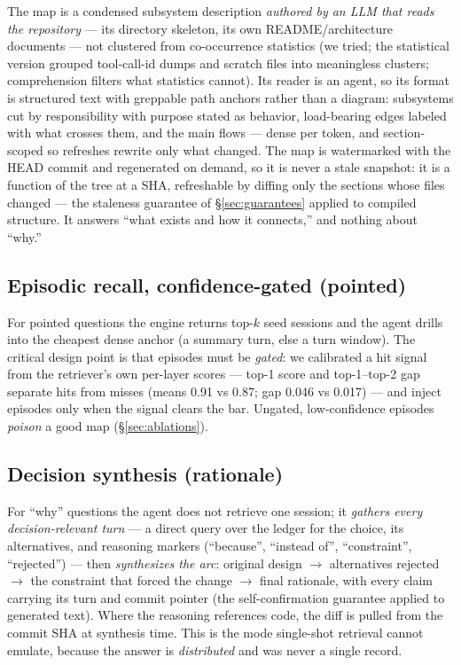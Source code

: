\documentclass[twocolumn,10pt]{article}
\begin{document}
The map is a condensed subsystem description \emph{authored by an LLM that reads the repository} --- its directory skeleton, its own README/architecture documents --- not clustered from co-occurrence statistics (we tried; the statistical version grouped tool-call-id dumps and scratch files into meaningless clusters; comprehension filters what statistics cannot). Its reader is an agent, so its format is structured text with greppable path anchors rather than a diagram: subsystems cut by responsibility with purpose stated as behavior, load-bearing edges labeled with what crosses them, and the main flows --- dense per token, and section-scoped so refreshes rewrite only what changed. The map is watermarked with the HEAD commit and regenerated on demand, so it is never a stale snapshot: it is a function of the tree at a SHA, refreshable by diffing only the sections whose files changed --- the staleness guarantee of \S\ref{sec:guarantees} applied to compiled structure. It answers ``what exists and how it connects,'' and nothing about ``why.''

\subsection{Episodic recall, confidence-gated (pointed)}

For pointed questions the engine returns top-$k$ seed sessions and the agent drills into the cheapest dense anchor (a summary turn, else a turn window). The critical design point is that episodes must be \emph{gated}: we calibrated a hit signal from the retriever's own per-layer scores --- top-1 score and top-1--top-2 gap separate hits from misses (means 0.91 vs 0.87; gap 0.046 vs 0.017) --- and inject episodes only when the signal clears the bar. Ungated, low-confidence episodes \emph{poison} a good map (\S\ref{sec:ablations}).

\subsection{Decision synthesis (rationale)}

For ``why'' questions the agent does not retrieve one session; it \emph{gathers every decision-relevant turn} --- a direct query over the ledger for the choice, its alternatives, and reasoning markers (``because'', ``instead of'', ``constraint'', ``rejected'') --- then \emph{synthesizes the arc}: original design $\to$ alternatives rejected $\to$ the constraint that forced the change $\to$ final rationale, with every claim carrying its turn and commit pointer (the self-confirmation guarantee applied to generated text). Where the reasoning references code, the diff is pulled from the commit SHA at synthesis time. This is the mode single-shot retrieval cannot emulate, because the answer is \emph{distributed} and was never a single record.
\end{document}
